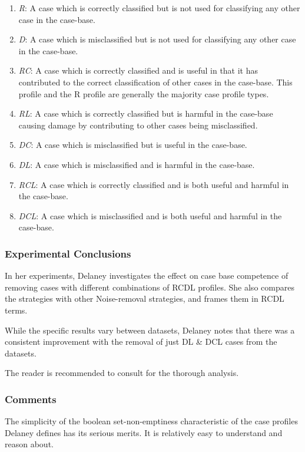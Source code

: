 \documentclass[a4paper,11pt]{report}
\begin{document}
\begin{enumerate}
	\item \emph{R}: A case which is correctly classified but is not used for classifying any other case in the case-base.
	\item \emph{D}: A case which is misclassified but is not used for classifying any other case in the case-base.
	\item \emph{RC}: A case which is correctly classified and is useful in that it has contributed to the correct classification of other cases in the case-base. This profile and the R profile are generally the majority case profile types.
	\item \emph{RL}: A case which is correctly classified but is harmful in the case-base causing damage by contributing to other cases being misclassified.
	\item \emph{DC}: A case which is misclassified but is useful in the case-base. 
	\item \emph{DL}: A case which is misclassified and is harmful in the case-base.
	\item \emph{RCL}: A case which is correctly classified and is both useful and harmful in the case-base.
	\item \emph{DCL}: A case which is misclassified and is both useful and harmful in the case-base.
\end{enumerate}


\subsubsection{Experimental Conclusions}
In her experiments, Delaney investigates the effect on case base competence of removing cases with different combinations of RCDL profiles. She also compares the strategies with other Noise-removal strategies, and frames them in RCDL terms.

While the specific results vary between datasets, Delaney notes that there was a consistent improvement with the removal of just DL \& DCL cases from the datasets. 

The reader is recommended to consult \citet{Delany2009} for the thorough analysis.

\subsubsection{Comments}
The simplicity of the boolean set-non-emptiness characteristic of the case profiles Delaney defines has its serious merits. It is relatively easy to understand and reason about. 
\end{document}
